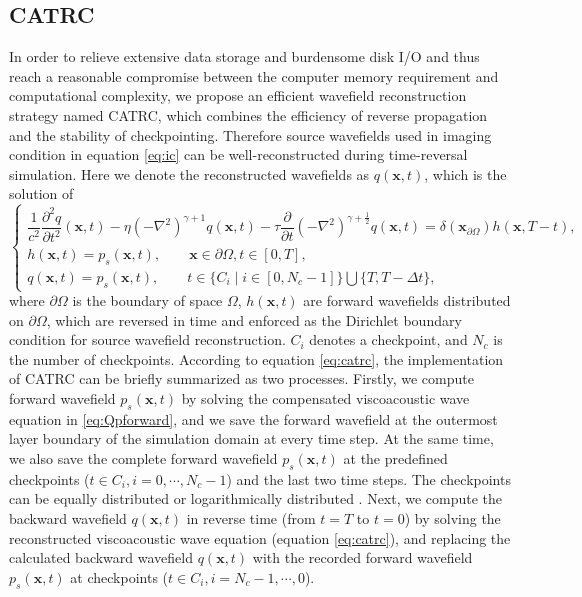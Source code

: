 \subsection{CATRC}

In order to relieve extensive data storage and burdensome disk I/O and thus reach a reasonable compromise between the computer memory requirement and computational complexity, we propose an efficient wavefield reconstruction strategy named CATRC, which combines the efficiency of reverse propagation and the stability of checkpointing. Therefore source wavefields used in imaging condition in equation \ref{eq:ic} can be well-reconstructed during time-reversal simulation. Here we denote the reconstructed wavefields as $q(\mathbf{x},t)$, which is the solution of
\begin{equation}  
\left\{  
             \begin{array}{lr}  
             \dfrac{1}{c^2}\dfrac{\partial^2q}{\partial t^2}(\mathbf{x},t)-\eta(-\nabla^2)^{\gamma+1}q(\mathbf{x},t)-\tau \dfrac{\partial}{\partial t}			
             (-\nabla^2)^{\gamma+\frac{1}{2}}q(\mathbf{x},t) = \delta(\mathbf{x}_{\partial \Omega})h(\mathbf{x},T-t),  &  \\  
             h(\mathbf{x},t)=p_s(\mathbf{x},t),   \qquad \mathbf{x} \in \partial \Omega, t \in [0,T] , &  \\
             q(\mathbf{x},t)=p_s(\mathbf{x},t),  \qquad  t \in \big \{C_i \mid i \in [0, N_c-1]\big \} \bigcup \big \{T, T-\Delta t\big \}, &
             \end{array}  
\right.  
\label{eq:catrc}
\end{equation} 
where $\partial \Omega$ is the boundary of space $\Omega$, $h(\mathbf{x},t)$ are forward wavefields distributed on $\partial \Omega$, which are reversed in time and enforced as the Dirichlet boundary condition for source wavefield reconstruction. $C_i$ denotes a checkpoint, and $N_c$ is the number of checkpoints. According to equation \ref{eq:catrc}, the implementation of CATRC can be briefly summarized as two processes. Firstly, we compute forward wavefield $p_s(\mathbf{x},t)$ by solving the compensated viscoacoustic wave equation in \ref{eq:Qpforward}, and we save the forward wavefield at the outermost layer boundary of the simulation domain at every time step. At the same time, we also save the complete forward wavefield $p_s(\mathbf{x},t)$ at the predefined checkpoints ($t \in C_i, i=0, \cdots , N_c-1$) and the last two time steps. The checkpoints can be equally distributed or logarithmically distributed \citep{Griewank2000Algorithm, Symes2007Reverse}. Next, we compute the backward wavefield $q(\mathbf{x},t)$ in reverse time (from $t=T$ to $t=0$) by solving the reconstructed viscoacoustic wave equation (equation \ref{eq:catrc}), and replacing the calculated backward wavefield $q(\mathbf{x},t)$ with the recorded forward wavefield $p_s(\mathbf{x},t)$ at checkpoints ($t \in C_i, i=N_c-1, \cdots , 0$).


